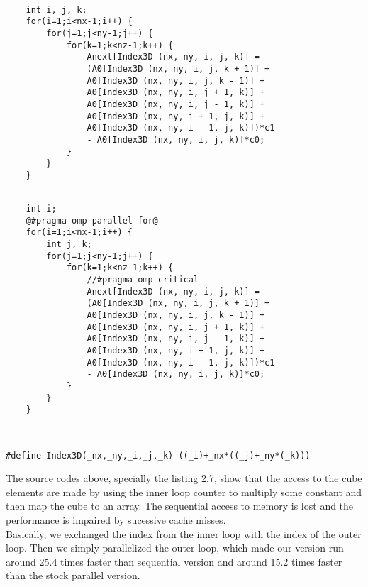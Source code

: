 \documentclass[10pt,a4paper]{report}
\begin{document}
\begin{center}
\begin{minipage}{.48\textwidth}
\begin{lstlisting}[caption=Parboil sequential source code for stencil,style=base]

	int i, j, k;
	for(i=1;i<nx-1;i++) {
		for(j=1;j<ny-1;j++) {
			for(k=1;k<nz-1;k++) {
				Anext[Index3D (nx, ny, i, j, k)] = 
				(A0[Index3D (nx, ny, i, j, k + 1)] +
				A0[Index3D (nx, ny, i, j, k - 1)] +
				A0[Index3D (nx, ny, i, j + 1, k)] +
				A0[Index3D (nx, ny, i, j - 1, k)] +
				A0[Index3D (nx, ny, i + 1, j, k)] +
				A0[Index3D (nx, ny, i - 1, j, k)])*c1
				- A0[Index3D (nx, ny, i, j, k)]*c0;
			}
		}
	}
\end{lstlisting}
\end{minipage}
\hfill
\begin{minipage}{.48\textwidth}
\begin{lstlisting}[caption=Parboil parallel source code for stencil,style=base]

	int i;
	@#pragma omp parallel for@
	for(i=1;i<nx-1;i++) {
		int j, k;
		for(j=1;j<ny-1;j++) {
			for(k=1;k<nz-1;k++) {
				//#pragma omp critical
				Anext[Index3D (nx, ny, i, j, k)] = 
				(A0[Index3D (nx, ny, i, j, k + 1)] +
				A0[Index3D (nx, ny, i, j, k - 1)] +
				A0[Index3D (nx, ny, i, j + 1, k)] +
				A0[Index3D (nx, ny, i, j - 1, k)] +
				A0[Index3D (nx, ny, i + 1, j, k)] +
				A0[Index3D (nx, ny, i - 1, j, k)])*c1
				- A0[Index3D (nx, ny, i, j, k)]*c0;
			}
		}
	}
\end{lstlisting}
\end{minipage}\\
\begin{lstlisting}[caption=Converts from 3D indices to array-represented cube,style=base]	
	#define Index3D(_nx,_ny,_i,_j,_k) ((_i)+_nx*((_j)+_ny*(_k)))
\end{lstlisting}
\end{center}

The source codes above, specially the listing 2.7, show that the access to the cube elements are made by using the inner loop counter to multiply some constant and then map the cube to an array. The sequential access to memory is lost and the performance is impaired by sucessive cache misses. \\

Basically, we exchanged the index from the inner loop with the index of the outer loop. Then we simply parallelized the outer loop, which made our version run around 25.4 times faster than sequential version and around 15.2 times faster than the stock parallel version.\\
\end{document}
